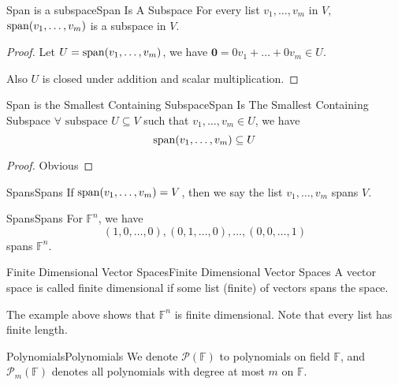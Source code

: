 \documentclass[../main.tex]{subfiles}
\begin{document}
\begin{theorem}{Span is a subspace}{Span Is A Subspace}
For every list $v_1, \ldots ,v_m$ in $V$, $\operatorname{span} (v_1, \ldots ,v_m)$ is a subspace in $V$.
\end{theorem}
\begin{proof}
Let $U = \operatorname{span}(v_1, \ldots ,v_m)$, we have $\boldsymbol{0} = 0v_1+\ldots +0v_m \in U$.

Also $U$ is closed under addition and scalar multiplication.
\end{proof}
\begin{theorem}{Span is the Smallest Containing Subspace}{Span Is The Smallest Containing Subspace}
$\forall \text{ subspace } U \subseteq V$ such that $v_1, \ldots ,v_m \in U$, we have
\begin{equation*}
\operatorname{span} (v_1, \ldots ,v_m) \subseteq U
\end{equation*}
\end{theorem}
\begin{proof}
Obvious
\end{proof}

\begin{definition}{Spans}{Spans}
If $\operatorname{span}(v_1, \ldots ,v_m) = V$, then we say the list $v_1, \ldots ,v_m$ spans $V$.
\end{definition}
\begin{example}{Spans}{Spans}
For $\mathbb{F}^n$, we have
\begin{equation}
	(1,0, \ldots ,0), (0,1, \ldots ,0), \ldots ,(0,0, \ldots ,1)
\end{equation}
spans  $\mathbb{F}^n$.
\end{example}

\begin{definition}{Finite Dimensional Vector Spaces}{Finite Dimensional Vector Spaces}
A vector space is called finite dimensional if some list (finite) of vectors spans the space.
\end{definition}
The example above shows that $\mathbb{F}^n$ is finite dimensional. Note that every list has finite length.

\begin{notation}{Polynomials}{Polynomials}
	We denote $\mathscr{P}(\mathbb{F})$ to polynomials on field $\mathbb{F}$, and $\mathscr{P}_m(\mathbb{F})$ denotes all polynomials with degree at most $m$ on $\mathbb{F}$.
\end{notation}
\end{document}
